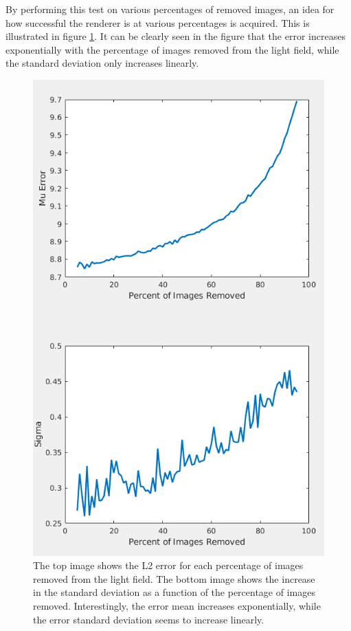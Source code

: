 \documentclass[12pt]{report}
\begin{document}
By performing this test on various percentages of removed images, an idea for how successful the renderer is at various percentages is acquired. This is illustrated in figure \ref{fig:error_values}. It can be clearly seen in the figure that the error increases exponentially with the percentage of images removed from the light field, while the standard deviation only increases linearly.

\begin{figure}[!ht]
	\centering
	\includegraphics[scale=0.50]{error_values.png}
	\caption{The top image shows the L2 error for each percentage of images removed from the light field. The bottom image shows the increase in the standard deviation as a function of the percentage of images removed. Interestingly, the error mean increases exponentially, while the error standard deviation seems to increase linearly.}
	\label{fig:error_values}
\end{figure}
\end{document}
